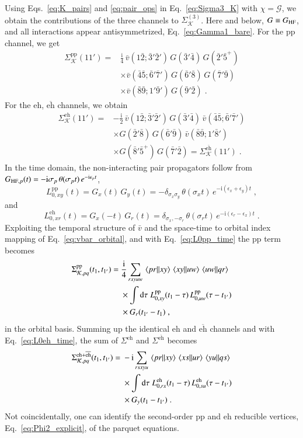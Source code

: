 \documentclass[aip,jcp,reprint,noshowkeys,superscriptaddress]{revtex4-1}
\newcommand{\cK}{\mathcal{K}}
\newcommand{\eps}{\epsilon}
\newcommand{\ii}{\mathrm{i}}
\newcommand{\eh}{\text{eh}}
\newcommand{\teh}{\overline{\text{eh}}}
\newcommand{\pp}{\text{pp}}
\begin{document}
Using Eqs.~\eqref{eq:K_pairs} and \eqref{eq:pair_ops} in Eq.~\eqref{eq:Sigma3_K} with $\chi = \mathcal G$, 
we obtain the contributions of the three channels to
$\Sigma^{(3)}_{\cK}$. Here and below, $G\equiv G_{\rm HF}$, and all interactions appear
antisymmetrized, Eq.~\eqref{eq:Gamma1_bare}.
For the $\pp$ channel, we get
\begin{align}
\Sigma^{\pp}_{\cK}(11')
={}&
\frac{\ii}{4}\,
\bar v(1\bar2;\bar3'\bar2')\,G(\bar3'\bar4)\,G(\bar2'\bar5^+)
\nonumber\\
&\times
\bar v(\bar4\bar5;\bar6'\bar7')\,G(\bar6'\bar8)\,G(\bar7'\bar9)
\nonumber\\
&\times
\bar v(\bar8\bar9;1'\bar9')\,G(\bar9'\bar2) \;.
\label{eq:Sigma_K_pp}
\end{align}
For the $\eh$, $\teh$ channels, we obtain 
\begin{align}
\Sigma^{\eh}_{\cK}(11')
={}&
-\frac{\ii}{2}\,
\bar v(1\bar2;\bar3'\bar2')\,G(\bar3'\bar4)\,\bar v(\bar4\bar5;\bar6'\bar7')
\nonumber\\
&\times
G(\bar2'\bar8)\,G(\bar6'\bar9)\,
\bar v(\bar8\bar9;1'\bar8')
\nonumber\\
&\times
G(\bar8'\bar5^+)\,G(\bar7'\bar2)
=
\Sigma^{\teh}_{\cK}(11') \;.
\label{eq:Sigma_K_eh}
\end{align}
In the time domain, the non-interacting pair propagators follow from
$G_{{\rm HF},p}(t)=-\ii\sigma_p\,\theta(\sigma_pt)\,e^{-\ii\eps_pt}$,
\begin{equation}
L^{\pp}_{0,xy}(t)
= 
G_x(t)\,G_y(t)
=
-\delta_{\sigma_x\sigma_y}\,\theta(\sigma_xt)\,
e^{-\ii(\eps_x+\eps_y)t} \;,
\label{eq:L0pp_time}
\end{equation}
and 
\begin{equation}
L^{\eh}_{0,xr}(t)
= 
G_x(-t)\,G_r(t) =
\delta_{\sigma_x,-\sigma_r}\,\theta(\sigma_rt)\,
e^{-\ii(\eps_r-\eps_x)t} \;.
\label{eq:L0eh_time}
\end{equation}
Exploiting the temporal structure of $\bar v$ and the space-time to 
orbital index mapping of Eq.~\eqref{eq:vbar_orbital}, and with 
Eq.~\eqref{eq:L0pp_time} the $\pp$ term becomes
\begin{align}
\Sigma^{\pp}_{\cK,pq}(t_1,t_{1'})
={}&
\frac{\ii}{4}
\sum_{rxyuw}
\mel{pr}{}{xy}\mel{xy}{}{uw}\mel{uw}{}{qr}
\nonumber\\
&\times
\int\dd\tau\;
L^{\pp}_{0,xy}(t_1-\tau)\,L^{\pp}_{0,uw}(\tau-t_{1'})
\nonumber\\
&\times
G_r(t_{1'}-t_1) \;,
\label{eq:Sigma_K_pp_time}
\end{align}
in the orbital basis. 
Summing up the identical $\eh$ and $\teh$ channels
and with Eq.~\eqref{eq:L0eh_time}, the 
sum of $\Sigma^{\eh}$ and $\Sigma^{\teh}$ becomes
\begin{align}
\Sigma^{\eh+\teh}_{\cK,pq}(t_1,t_{1'})
={}&
-\ii
\sum_{rsxyu}
\mel{pr}{}{xy}\mel{xs}{}{ur}\mel{yu}{}{qs}
\nonumber\\
&\times
\int\dd\tau\;
L^{\eh}_{0,rx}(t_1-\tau)\,L^{\eh}_{0,su}(\tau-t_{1'})
\nonumber\\
&\times
G_y(t_1-t_{1'}) \;.
\label{eq:Sigma_K_eh_time}
\end{align}
Not coincidentally, one can identify the second-order $\pp$ and
$\eh$ reducible vertices, Eq.~\eqref{eq:Phi2_explicit}, of the parquet
equations. 
\end{document}
